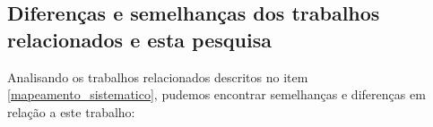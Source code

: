 \begin{comment}
 
 Preciso falar sobre o problema de empresas famosas como NetFlix possuírem um alto número de estrelas. Isso também acontece com profissionais que trabalham nessas empresas. Normalmente, eles também terão muitos seguidores. Isso obviamente nem sempre está relacionado à expertise dessas pessoas. Ao invés disso, eles podem ter um número alto de seguidores pois as pessoas normalmente se interessam pelas novidades dos projetos criados por essas empresas. 
 

A literatura sugere que projetos maiores vão ter um prejuízo de produtividade devido à complexidade adicional trazida pelo seu tamanho. Realizar alterações em um projeto menor normalmente é mais fácil do que realizar alterações em projetos menores. Isso deveria ser considerado em um modelo como o nosso que tem como base uma estimação de produtividade.

Existem muitos problemas com os dados do GHTOrrent. O melhor teria sido obter apenas algumas informações de lá e o restante diretamente da API do GitHub.



É possível que a popularidade do projeto seja influenciada significativamente quando ele é desenvolvido por uma empresa grande. Ou seja, a causa de um projeto ter um alto número de estrelas não necessariamente é devido a relevância que a comunidade dá ao projeto. Ao invés disso, a popularidade do projeto pode ter sido obtida devido a popularidade da empresa. Um exemplo é o caso do projeto blitz4j que possui 504 estrelas. Enquanto isso, o projeto tinylog possui apenas 142. Entretanto, uma pesquisa em sites de buscas revela que o tinylog é 4 vezes mais citado que o blitz4j. Logo, a maior quantidade de estrelas do blitz4j não reflete a sua popularidade entre os desenvolvedores.

\end{comment}

\subsection{Diferenças e semelhanças dos trabalhos relacionados e esta pesquisa}

Analisando os trabalhos relacionados descritos no item \ref{mapeamento_sistematico}, pudemos encontrar semelhanças e diferenças em relação a este trabalho:

